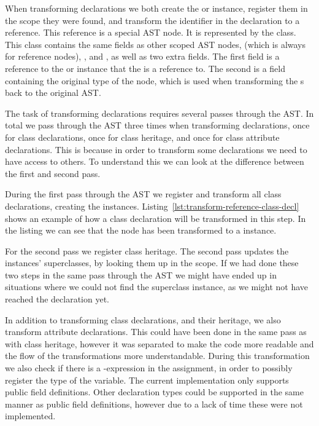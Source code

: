 When transforming declarations we both create the  or  instance, register them in the scope they were found, and transform the identifier in the declaration to a reference.
This reference is a special AST node.
It is represented by the  class.
This class contains the same fields as other scoped AST nodes,  (which is always  for reference nodes), ,  and , as well as two extra fields.
The first field is a reference to the  or  instance that the  is a reference to.
The second is a field containing the original type of the node, which is used when transforming the s back to the original AST\@.

The task of transforming declarations requires several passes through the AST\@.
In total we pass through the AST three times when transforming declarations, once for class declarations, once for class heritage, and once for class attribute declarations.
This is because in order to transform some declarations we need to have access to others.
To understand this we can look at the difference between the first and second pass.

During the first pass through the AST we register and transform all class declarations, creating the  instances.
Listing~\vref{lst:transform-reference-class-decl} shows an example of how a class declaration will be transformed in this step.
In the listing we can see that the  node has been transformed to a  instance.

For the second pass we register class heritage.
The second pass updates the  instances' superclasses, by looking them up in the scope.
If we had done these two steps in the same pass through the AST we might have ended up in situations where we could not find the superclass instance, as we might not have reached the declaration yet.

In addition to transforming class declarations, and their heritage, we also transform attribute declarations.
This could have been done in the same pass as with class heritage, however it was separated to make the code more readable and the flow of the transformations more understandable.
During this transformation we also check if there is a -expression in the assignment, in order to possibly register the type of the variable.
The current implementation only supports public field definitions.
Other declaration types could be supported in the same manner as public field definitions, however due to a lack of time these were not implemented.

